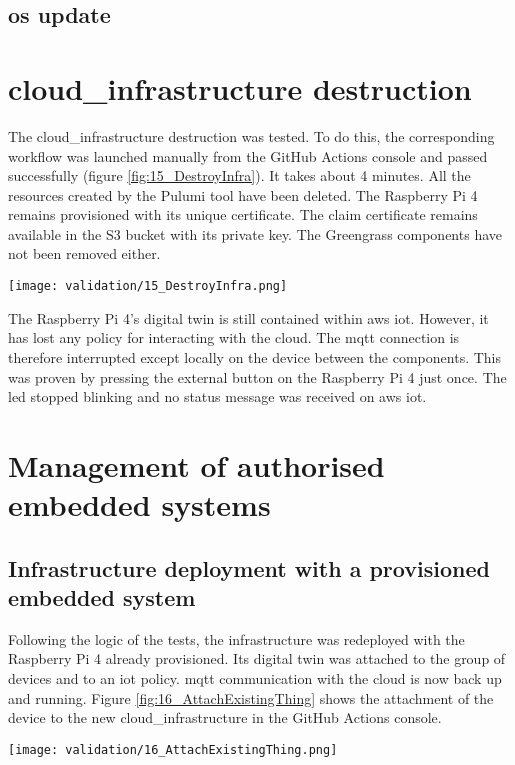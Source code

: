 \subsection{\texorpdfstring{\acrshort{os}}{} update}

\section{\texorpdfstring{\Gls{cloud_infrastructure}}{} destruction}

The \gls{cloud_infrastructure} destruction was tested. To do this, the corresponding workflow was launched manually from the GitHub Actions console and passed successfully (figure \ref{fig:15_DestroyInfra}). It takes about 4 minutes. All the resources created by the Pulumi tool have been deleted. The Raspberry Pi 4 remains provisioned with its unique certificate. The claim certificate remains available in the S3 bucket with its private key. The Greengrass components have not been removed either.
\begin{center}
    \begingroup
    \texttt{[image: validation/15\_DestroyInfra.png]}
    \label{fig:15_DestroyInfra}
    \endgroup
\end{center}
The Raspberry Pi 4's digital twin is still contained within \gls{aws} \acrshort{iot}. However, it has lost any policy for interacting with the \gls{cloud}. The \acrshort{mqtt} connection is therefore interrupted except locally on the device between the components. This was proven by pressing the external button on the Raspberry Pi 4 just once. The led stopped blinking and no status message was received on \gls{aws} \acrshort{iot}.

\section{Management of authorised embedded systems}

\subsection{Infrastructure deployment with a provisioned embedded system}
Following the logic of the tests, the infrastructure was redeployed with the Raspberry Pi 4 already provisioned. Its digital twin was attached to the group of devices and to an \acrshort{iot} policy. \acrshort{mqtt} communication with the \gls{cloud} is now back up and running. Figure \ref{fig:16_AttachExistingThing} shows the attachment of the device to the new \gls{cloud_infrastructure} in the GitHub Actions console.
\begin{center}
    \begingroup
    \texttt{[image: validation/16\_AttachExistingThing.png]}
    \label{fig:16_AttachExistingThing}
    \endgroup
\end{center}

